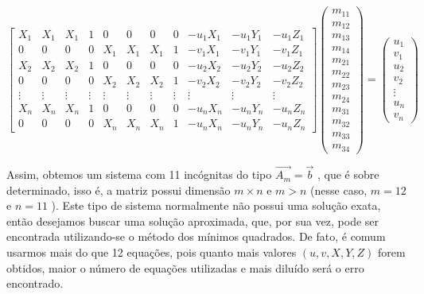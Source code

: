\documentclass[ecp,tc]{iiufrgs}
\begin{document}
\[
\begin{bmatrix}
X_1 & X_1 & X_1 & 1 & 0 & 0 & 0 & 0 & -u_1X_1 & -u_1Y_1 & -u_1Z_1 \\
0 & 0 & 0 & 0 & X_1 & X_1 & X_1 & 1 & -v_1X_1 & -v_1Y_1 & -v_1Z_1 \\
X_2 & X_2 & X_2 & 1 & 0 & 0 & 0 & 0 & -u_2X_2 & -u_2Y_2 & -u_2Z_2 \\
0 & 0 & 0 & 0 & X_2 & X_2 & X_2 & 1 & -v_2X_2 & -v_2Y_2 & -v_2Z_2 \\
\vdots & \vdots & \vdots & \vdots & \vdots & \vdots & \vdots & \vdots & \vdots & \vdots & \vdots \\
X_n & X_n & X_n & 1 & 0 & 0 & 0 & 0 & -u_nX_n & -u_nY_n & -u_nZ_n \\
0 & 0 & 0 & 0 & X_n & X_n & X_n & 1 & -u_nX_n & -u_nY_n & -u_nZ_n 
\end{bmatrix}
\begin{pmatrix}m_{11} \\ m_{12} \\ m_{13} \\ m_{14} \\ m_{21} \\ m_{22} \\ m_{23} \\ m_{24} \\ m_{31} \\ m_{32} \\ m_{33} \\ m_{34} \end{pmatrix} = \begin{pmatrix} u_1 \\ v_1 \\ u_2 \\ v_2 \\ \vdots \\ u_n \\ v_n \end{pmatrix}
\]

Assim, obtemos um sistema com 11 incógnitas do tipo $ \vec{A_m} = \vec{b} $ , que é sobre determinado, isso é, a matriz possui dimensão $ m \times n $ e $ m > n $ (nesse caso, $ m = 12 $ e $ n = 11$ ). Este tipo de sistema normalmente não possui uma solução exata, então desejamos buscar uma solução aproximada, que, por sua vez, pode ser encontrada utilizando-se o método dos mínimos quadrados. De fato, é comum usarmos mais do que 12 equações, pois quanto mais valores $ (u, v, X, Y, Z) $ forem obtidos, maior o número de equações utilizadas e mais diluído será o erro encontrado.
\end{document}
